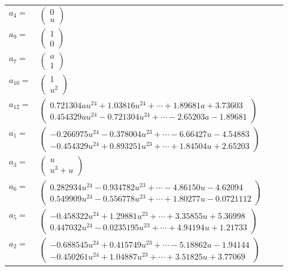 \documentclass[1p]{elsarticle_modified}
\theoremstyle{definition}
\begin{document}
\begin{tabular}{m{7pt} m{180pt} m{7pt} m{180pt} }
\flushright $a_{4}=$&$\begin{pmatrix}0\\u\end{pmatrix}$ \\
\flushright $a_{9}=$&$\begin{pmatrix}1\\0\end{pmatrix}$ \\
\flushright $a_{7}=$&$\begin{pmatrix}a\\1\end{pmatrix}$ \\
\flushright $a_{10}=$&$\begin{pmatrix}1\\u^2\end{pmatrix}$ \\
\flushright $a_{12}=$&$\begin{pmatrix}0.721304 a u^{24}+1.03816 u^{24}+\cdots+1.89681 a+3.73603\\0.454329 a u^{24}-0.721304 u^{24}+\cdots-2.65203 a-1.89681\end{pmatrix}$ \\
\flushright $a_{1}=$&$\begin{pmatrix}-0.266975 u^{24}-0.378004 u^{23}+\cdots-6.66427 u-4.54883\\-0.454329 u^{24}+0.893251 u^{23}+\cdots+1.84504 u+2.65203\end{pmatrix}$ \\
\flushright $a_{3}=$&$\begin{pmatrix}u\\u^3+u\end{pmatrix}$ \\
\flushright $a_{6}=$&$\begin{pmatrix}0.282934 u^{24}-0.934782 u^{23}+\cdots-4.86150 u-4.62094\\0.549909 u^{24}-0.556778 u^{23}+\cdots+1.80277 u-0.0721112\end{pmatrix}$ \\
\flushright $a_{5}=$&$\begin{pmatrix}-0.458322 u^{24}+1.29881 u^{23}+\cdots+3.35855 u+5.36998\\0.447032 u^{24}-0.0235195 u^{23}+\cdots+4.94194 u+1.21733\end{pmatrix}$ \\
\flushright $a_{2}=$&$\begin{pmatrix}-0.688545 u^{24}+0.415749 u^{23}+\cdots-5.18862 u-1.94144\\-0.450261 u^{24}+1.04887 u^{23}+\cdots+3.51825 u+3.77069\end{pmatrix}$ \\

\end{tabular}
\end{document}
